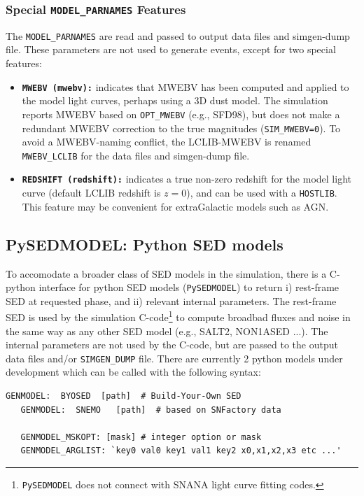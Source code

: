 \documentclass[12pt]{article}
\begin{document}
\clearpage
\subsubsection{Special {\tt MODEL\_PARNAMES} Features}
\label{sss:LCLIB_parnames}

The {\tt MODEL\_PARNAMES} are read and passed to output data files 
and simgen-dump file. These parameters are not used to generate events,
except for two special features:

\begin{itemize}
  \item {\tt\bf MWEBV (mwebv):} indicates that MWEBV has been computed
     and applied to the model light curves, perhaps using a 3D dust model.
     The simulation reports MWEBV based on {\tt OPT\_MWEBV} (e.g., SFD98),
     but does not make a redundant MWEBV correction to the true
     magnitudes ({\tt SIM\_MWEBV=0}). To avoid a MWEBV-naming conflict,
     the LCLIB-MWEBV is renamed {\tt MWEBV\_LCLIB} for the data files
     and simgen-dump file.
  \item {\tt\bf REDSHIFT (redshift):}
     indicates a true non-zero redshift for the model light curve
     (default LCLIB redshift is $z=0$), 
     and can be used with a {\tt HOSTLIB}. 
     This feature may be convenient for extraGalactic models such as AGN.
\end{itemize}


\clearpage
\subsection{PySEDMODEL: Python SED models}
\label{subsec:PySEDMODEL}

To accomodate a broader class of SED models in the simulation,
there is a C-python interface for python SED models ({\tt PySEDMODEL}) 
to return
i) rest-frame SED at requested phase, and 
ii) relevant internal parameters.
The rest-frame SED is used by the simulation C-code\footnote{{\tt PySEDMODEL}
  does not connect with SNANA light curve fitting codes.}
to compute broadbad fluxes and noise in the same way as
any other SED model (e.g., SALT2, NON1ASED ...). 
The internal parameters are not used by the C-code, 
but are passed to the output data files and/or {\tt SIMGEN\_DUMP} file.
There are currently 2 python models under development which
can be called with the following syntax:
%
\begin{Verbatim}[frame=single]
   GENMODEL:  BYOSED  [path]  # Build-Your-Own SED
   GENMODEL:  SNEMO   [path]  # based on SNFactory data

   GENMODEL_MSKOPT: [mask] # integer option or mask
   GENMODEL_ARGLIST: `key0 val0 key1 val1 key2 x0,x1,x2,x3 etc ...'
\end{Verbatim}
\end{document}
